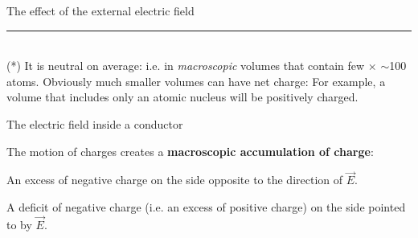 \begin{frame}{The effect of the external electric field}
\noindent\rule{2cm}{0.4pt}\\
{\scriptsize
 (*) It is neutral on average: i.e. in {\em macroscopic} volumes that contain few $\times$ $\sim$100 atoms.
 Obviously much smaller volumes can have net charge:
 For example, a volume that includes only an atomic nucleus will be positively charged.\\
}

\end{frame}

%
%
%

\begin{frame}{The electric field inside a conductor}

The motion of charges creates a {\bf macroscopic accumulation of charge}:
\begin{itemize}
{\small
  \item An excess of negative charge on the side opposite to the
        direction of $\vec{E}$.
  \item A deficit of negative charge (i.e. an excess of positive charge)
        on the side pointed to by $\vec{E}$.
}
\end{itemize}


\end{frame}
